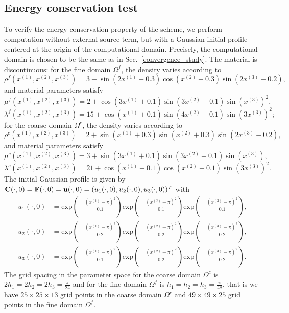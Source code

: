 \subsection{Energy conservation test}\label{conserved_energy}
To verify the energy conservation property of the scheme, we perform computation without external source term, but with a Gaussian initial profile centered at the origin of the computational domain.  Precisely, the computational domain is chosen to be the same as in Sec.~\ref{convergence_study}. The material is discontinuous: for the fine domain $\Omega^f$,  the density varies according to
\[\rho^f(x^{(1)},x^{(2)},x^{(3)}) = 3 + \sin(2x^{(1)}+0.3)\cos(x^{(2)}+0.3)\sin(2x^{(3)}-0.2),\] 
and material parameters satisfy
\[\mu^f(x^{(1)},x^{(2)},x^{(3)}) = 2 + \cos(3x^{(1)}+0.1)\sin(3x^{(2)}+0.1)\sin(x^{(3)})^2,\]
\[\lambda^f(x^{(1)},x^{(2)},x^{(3)}) = 15 + \cos(x^{(1)}+0.1)\sin(4x^{(2)}+0.1)\sin(3x^{(3)})^2;\]
for the coarse domain $\Omega^c$, the density varies according to
\[\rho^c(x^{(1)},x^{(2)},x^{(3)}) = 2 + \sin(x^{(1)}+0.3)\sin(x^{(2)}+0.3)\sin(2x^{(3)}-0.2),\] 
and material parameters satisfy
\[\mu^c(x^{(1)},x^{(2)},x^{(3)}) = 3 + \sin(3x^{(1)}+0.1)\sin(3x^{(2)}+0.1)\sin(x^{(3)}),\]
\[\lambda^c(x^{(1)},x^{(2)},x^{(3)}) = 21 + \cos(x^{(1)}+0.1)\cos(x^{(2)}+0.1)\sin(3x^{(3)})^2.\]
The initial Gaussian profile is given by ${\bf C}(\cdot,0) = {\bf F}(\cdot,0) = {\bf u}(\cdot,0) = (u_1(\cdot,0),u_2(\cdot,0),u_3(\cdot,0))^T$ with
\begin{align*}
	u_1(\cdot,0) &= \mbox{exp}\left(-\frac{(x^{(1)}-\pi)^2}{0.1}\right)\mbox{exp}\left(-\frac{(x^{(2)}-\pi)^2}{0.1}\right)\mbox{exp}\left(-\frac{(x^{(3)}-\pi)^2}{0.1}\right),\\
	u_2(\cdot,0) &= \mbox{exp}\left(-\frac{(x^{(1)}-\pi)^2}{0.2}\right)\mbox{exp}\left(-\frac{(x^{(2)}-\pi)^2}{0.2}\right)\mbox{exp}\left(-\frac{(x^{(3)}-\pi)^2}{0.2}\right),\\
	u_3(\cdot,0) &= \mbox{exp}\left(-\frac{(x^{(1)}-\pi)^2}{0.1}\right)\mbox{exp}\left(-\frac{(x^{(2)}-\pi)^2}{0.2}\right)\mbox{exp}\left(-\frac{(x^{(3)}-\pi)^2}{0.2}\right).
\end{align*}
 The grid spacing in the parameter space for the coarse domain $\Omega^c$ is $2h_1 = 2h_2 = 2h_3 = \frac{\pi}{24}$ and for the fine domain $\Omega^f$ is $h_1 = h_2 = h_3 = \frac{\pi}{48}$, that is we have $25\times25\times13$ grid points in the coarse domain $\Omega^c$ and $49\times49\times25$ grid points in the fine domain $\Omega^f$. 


